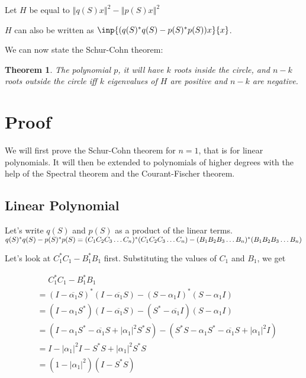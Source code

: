 \documentclass[twofold]{article}
\newcommand*\conj[1]{\overline{#1}}
\newcommand*\adj[1]{#1^*}
\newcommand*\norm[1]{\left \Vert #1 \right\Vert}
\newcommand*\abs[1]{\left \vert #1 \right\vert}
\theoremstyle{plain}
\newtheorem*{theorem}{Theorem}
\theoremstyle{definition}
\begin{document}
Let \(H\) be equal to \(\norm{ q(S) x }^2 - \norm{ p(S) x}^2\)

\(H\) can also be written as \(\inp{(\adj{q(S)} q(S) - \adj{p(S)} p(S))x}{ x}\).

We can now state the Schur-Cohn theorem:

\begin{theorem}The polynomial \(p\), it will have \(k\) roots inside the circle, and \(n-k\) roots outside the circle iff \(k\) eigenvalues of \(H\) are positive and \(n-k\) are negative. \end{theorem}

\section{Proof}

We will first prove the Schur-Cohn theorem for \(n =1\), that is for linear polynomials. It will then be extended to polynomials of higher degrees with the help of the Spectral theorem and the Courant-Fischer theorem. 


\subsection{Linear Polynomial}


Let's write \(q(S)\) and \(p(S)\) as a product of the linear terms. \(\adj{q(S)} q(S) - \adj{p(S)} p(S) \\= \adj{(C_1C_2C_3 \ldots C_n)}(C_1C_2C_3\ldots C_n) - \adj{(B_1B_2B_3\ldots B_n)} (B_1B_2B_3\ldots B_n)\)

Let's look at \(\adj{C_1} C_1 - \adj{B_1} B_1\) first. Substituting the values of \(C_1\) and \(B_1\), we get 

\begin{equation*}
\begin{split}
& \phantom{=}    \adj{C_1}C_1 - \adj{B_1} B_1 \\
 & = \adj{(I - \conj{\alpha_1}S)} (I - \conj{\alpha_1}S) - \adj{(S - \alpha_1 I)} (S - \alpha_1 I) \\
& = (I - \alpha_1\adj{S}) (I - \conj{\alpha_1}S) - (\adj{S} - \conj{\alpha_1} I) (S - \alpha_1 I) \\
 & = (I - \alpha_1\adj{S} - \conj{\alpha_1}S + \abs{\alpha_1}^2 \adj{S} S) - (\adj{S} S - \alpha_1 \adj{S} - \conj{\alpha_1} S + \abs{\alpha_1}^2I)\\
& = I - \abs{\alpha_1}^2 I - \adj{S} S + \abs{\alpha_1}^2 \adj{S} S \\
& = (1 - \abs{\alpha_1}^2) (I - \adj{S} S)
\end{split}
\end{equation*}
\end{document}
